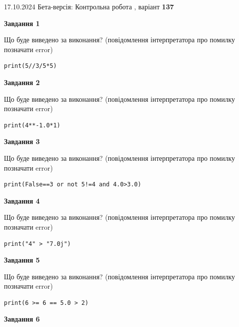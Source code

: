 \documentclass[12pt, ukrainian]{article}
\begin{document}
{\Large{17.10.2024 Бета-версія: Контрольна робота , варіант  \No \textbf { 137 }\par}}
{
\begin {large}
{\begin {center}\textbf{Завдання 1}\end {center}}

Що буде виведено за виконання? (повідомлення інтерпретатора про помилку позначати error)\par
\begin{verbatim}
print(5//3/5*5)
\end{verbatim}

{\begin {center}\textbf{Завдання 2}\end {center}}

Що буде виведено за виконання? (повідомлення інтерпретатора про помилку позначати error)\par
\begin{verbatim}
print(4**-1.0*1)
\end{verbatim}

{\begin {center}\textbf{Завдання 3}\end {center}}

Що буде виведено за виконання? (повідомлення інтерпретатора про помилку позначати error)\par
\begin{verbatim}
print(False==3 or not 5!=4 and 4.0>3.0)
\end{verbatim}

{\begin {center}\textbf{Завдання 4}\end {center}}

Що буде виведено за виконання? (повідомлення інтерпретатора про помилку позначати error)\par
\begin{verbatim}
print("4" > "7.0j")
\end{verbatim}

{\begin {center}\textbf{Завдання 5}\end {center}}

Що буде виведено за виконання? (повідомлення інтерпретатора про помилку позначати error)\par
\begin{verbatim}
print(6 >= 6 == 5.0 > 2)
\end{verbatim}

{\begin {center}\textbf{Завдання 6}\end {center}}


\end{large}}
\end{document}
